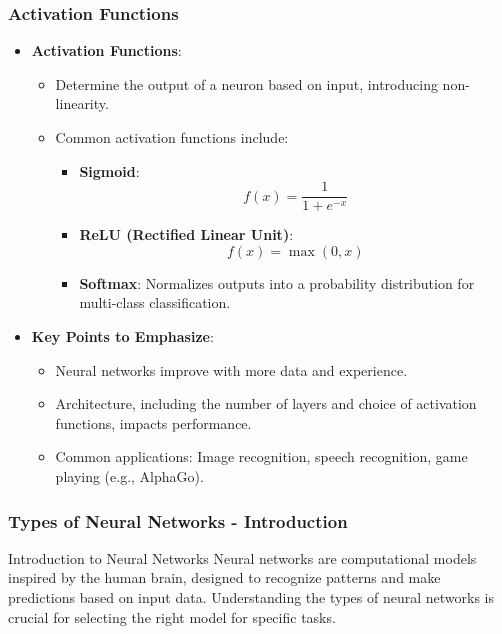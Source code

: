 \documentclass[aspectratio=169]{beamer}
\begin{document}
\begin{frame}[fragile]
    \frametitle{Activation Functions}
    \begin{itemize}
        \item \textbf{Activation Functions}:
        \begin{itemize}
            \item Determine the output of a neuron based on input, introducing non-linearity.
            \item Common activation functions include:
            \begin{itemize}
                \item \textbf{Sigmoid}:
                \begin{equation}
                    f(x) = \frac{1}{1 + e^{-x}}
                \end{equation}
                \item \textbf{ReLU (Rectified Linear Unit)}:
                \begin{equation}
                    f(x) = \max(0, x)
                \end{equation}
                \item \textbf{Softmax}: Normalizes outputs into a probability distribution for multi-class classification.
            \end{itemize}
        \end{itemize}
        
        \item \textbf{Key Points to Emphasize}:
        \begin{itemize}
            \item Neural networks improve with more data and experience.
            \item Architecture, including the number of layers and choice of activation functions, impacts performance.
            \item Common applications: Image recognition, speech recognition, game playing (e.g., AlphaGo).
        \end{itemize}
    \end{itemize}
\end{frame}

\begin{frame}[fragile]
    \frametitle{Types of Neural Networks - Introduction}
    \begin{block}{Introduction to Neural Networks}
        Neural networks are computational models inspired by the human brain, designed to recognize patterns and make predictions based on input data. 
        Understanding the types of neural networks is crucial for selecting the right model for specific tasks.
    \end{block}
\end{frame}
\end{document}
